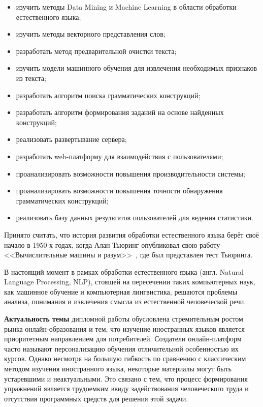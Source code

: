 \begin{itemize}
  \item изучить методы Data Mining и Machine Learning в области обработки естественного языка; 
  \item изучить методы векторного представления слов;
  \item разработать метод предварительной очистки текста;
  \item изучить модели машинного обучения для извлечения необходимых признаков из текста;
  \item разработать алгоритм поиска грамматических конструкций;
  \item разработать алгоритм формирования заданий на основе найденных конструкций;
  \item реализовать развертывание сервера;
  \item разработать web-платформу для взаимодействия с пользователями;
  \item проанализировать возможности повышения производительности системы;
  \item проанализировать возможности повышения точности обнаружения грамматических конструкций;
  \item реализовать базу данных результатов пользователей для ведения статистики.
\end{itemize}

\newpage
\Intro
Принято считать, что история развития обработки естественного языка берёт своё начало в 1950-х годах, когда Алан Тьюринг опубликовал свою работу <<Вычислительные машины и разум>>~\cite{turing1950computing}, где был представлен тест Тьюринга.

В настоящий момент в рамках обработки естественного языка (англ. Natural Language Processing, NLP), стоящей на пересечении таких компьютерных наук, как машинное обучение и компьютерная лингвистика, решаются проблемы анализа, понимания и извлечения смысла из естественной человеческой речи.

\textbf{Актуальность темы} дипломной работы обусловлена стремительным ростом рынка онлайн-образования и тем, что изучение иностранных языков является приоритетным направлением для потребителей.
Создатели онлайн-платформ часто называют персонализацию обучения отличительной особенностью их курсов. Однако несмотря на большую гибкость по сравнению с классическим методом изучения иностранного языка, некоторые материалы могут быть устаревшими и неактуальными. Это связано с тем, что процесс формирования упражнений является трудоемким ввиду задействования человеческого труда и отсутствия программных средств для решения этой задачи.

